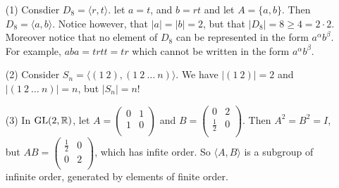 \begin{example}\label{example_2.9}
  \begin{enumerate}
    \item[(1)] Consdier $D_8=\langle r, t \rangle$. let $a=t$, and
      $b=rt$ and let $A=\{a,b\}$. Then $D_8=\langle a,b \rangle$. Notice however,
      that $|a|=|b|=2$, but that $|D_8|=8 \geq 4 = 2 \cdot 2$.
      Moreover notice that no element of $D_8$ can be represented in the
      form $a^\alpha b^\beta$. For example,  $aba=trtt=tr$ which cannot be
      written in the form $a^\alpha b^\beta$.

    \item[(2)] Consider $S_n=\langle (1 \ 2), (1 \ 2 \ \dots \ n)
      \rangle$. We have $|(1 \ 2)|=2$ and $|(1 \ 2 \ \dots \ n)|=n$,
      but $|S_n|=n!$

    \item[(3)] In $\operatorname{GL}(2,\mathbb{R})$, let $A=\begin{pmatrix}0 & 1 \\ 1 & 0
        \\\end{pmatrix}$ and $B=\begin{pmatrix}0 & 2 \\ \frac{1}{2} & 0
      \\\end{pmatrix}$. Then $A^2=B^2=I$, but
        $AB=\begin{pmatrix} \frac{1}{2} & 0 \\ 0 & 2 \\\end{pmatrix}$,
        which has infite order. So $\langle A,B \rangle$ is a subgroup of
        infinite order, generated by elements of finite order.
    \end{enumerate}
  \end{example}
